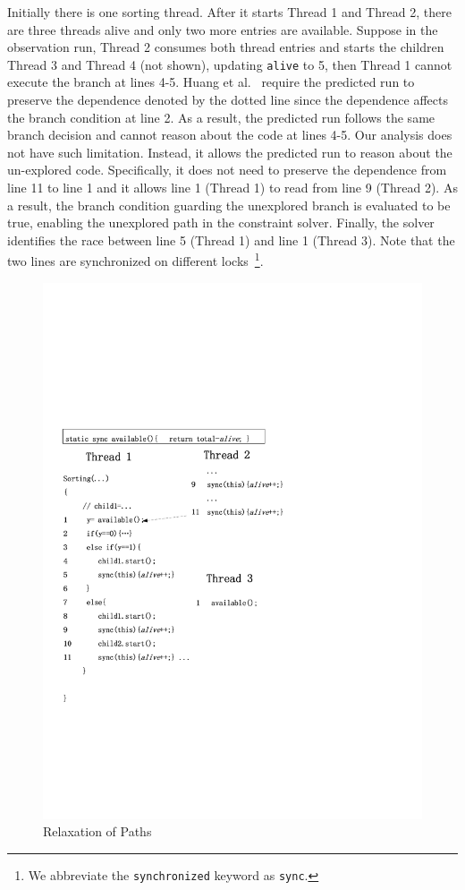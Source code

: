 
Initially there is one sorting thread. After it starts Thread 1 and Thread 2, there are three threads alive and only two more entries are available.
Suppose in the observation run, Thread 2 consumes both thread entries and starts the children Thread 3 and Thread 4 (not shown), updating {\tt alive} to 5, then Thread 1 cannot execute the branch at lines 4-5. Huang et al.~\cite{} require the predicted run to preserve the dependence denoted by the dotted line since the dependence affects the branch condition at line 2. As a result, the predicted run follows the same branch decision and cannot reason about the code at lines 4-5. Our analysis does not have such limitation. Instead, it allows the predicted run to reason about the un-explored code. Specifically, it does not need to preserve the dependence from line 11 to line 1 and it allows line 1 (Thread 1) to read from line 9 (Thread 2). As a result, the branch condition guarding the unexplored branch is evaluated to be true, enabling the unexplored path in the constraint solver. Finally, the solver identifies the race between line 5 (Thread 1) and line 1 (Thread 3). Note that the two lines are synchronized on different locks~\footnote{We abbreviate the {\tt synchronized} keyword as {\tt sync}.
}. 

 


\begin{figure}[htp]
\centering
\includegraphics[scale=0.7]{cases/Visio-msort.pdf}
\caption{Relaxation of Paths}\label{fig:relax2}
\end{figure}



